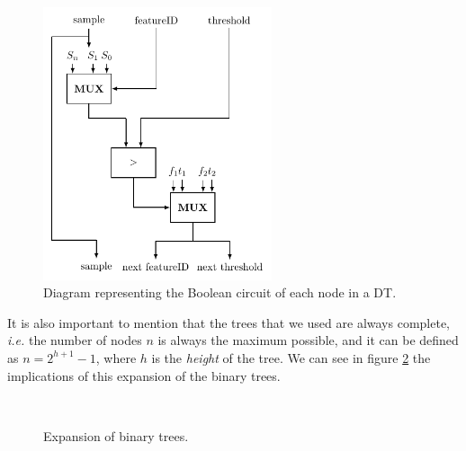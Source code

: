 \begin{figure}[!ht]
  \centering
  \includegraphics[width=0.60\textwidth]{images/decision_tree_node.pdf}
  \caption{Diagram representing the Boolean circuit of each node in a \ac{DT}.}
  \label{fig:DTNode}
\end{figure}


It is also important to mention that the trees that we used are always complete, \textit{i.e.} the number of nodes $n$ is always the maximum possible, and it can be defined as $n=2^{h+1}-1$, where $h$ is the \textit{height} of the tree. We can see in figure \ref{fig:ExpansionBinaryTrees} the implications of this expansion of the binary trees.

\begin{figure}[H]
	\centering
	\mbox{
	}
	\label{fig:ExpansionBinaryTrees}
	\caption{Expansion of binary trees.}
\end{figure}



